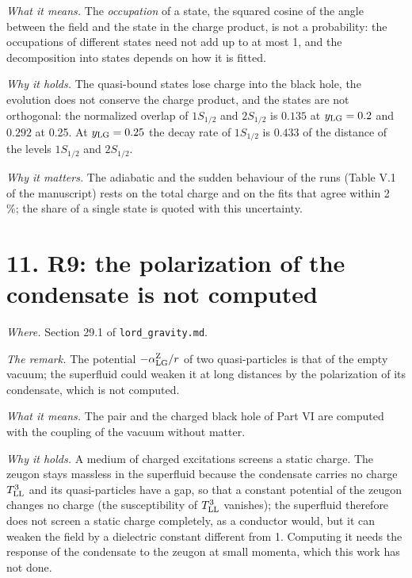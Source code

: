 \documentclass[
  10pt,
]{article}
\begin{document}
\emph{What it means.} The \emph{occupation} of a state, the squared
cosine of the angle between the field and the state in the charge
product, is not a probability: the occupations of different states need
not add up to at most 1, and the decomposition into states depends on
how it is fitted.

\emph{Why it holds.} The quasi-bound states lose charge into the black
hole, the evolution does not conserve the charge product, and the states
are not orthogonal: the normalized overlap of \(1S_{1/2}\) and
\(2S_{1/2}\) is \(0.135\) at \(y_{\rm LG}=0.2\) and \(0.292\) at 0.25.
At \(y_{\rm LG}=0.25\) the decay rate of \(1S_{1/2}\) is \(0.433\) of
the distance of the levels \(1S_{1/2}\) and \(2S_{1/2}\).

\emph{Why it matters.} The adiabatic and the sudden behaviour of the
runs (Table V.1 of the manuscript) rests on the total charge and on the
fits that agree within 2 \%; the share of a single state is quoted with
this uncertainty.

\hypertarget{r9-the-polarization-of-the-condensate-is-not-computed}{%
\section{11. R9: the polarization of the condensate is not
computed}\label{r9-the-polarization-of-the-condensate-is-not-computed}}

\emph{Where.} Section 29.1 of \texttt{lord\_gravity.md}.

\emph{The remark.} The potential \(-\alpha^{\rm Z}_{\rm LG}/r\) of two
quasi-particles is that of the empty vacuum; the superfluid could weaken
it at long distances by the polarization of its condensate, which is not
computed.

\emph{What it means.} The pair and the charged black hole of Part VI are
computed with the coupling of the vacuum without matter.

\emph{Why it holds.} A medium of charged excitations screens a static
charge. The zeugon stays massless in the superfluid because the
condensate carries no charge \(T^3_{\rm LL}\) and its quasi-particles
have a gap, so that a constant potential of the zeugon changes no charge
(the susceptibility of \(T^3_{\rm LL}\) vanishes); the superfluid
therefore does not screen a static charge completely, as a conductor
would, but it can weaken the field by a dielectric constant different
from 1. Computing it needs the response of the condensate to the zeugon
at small momenta, which this work has not done.
\end{document}
